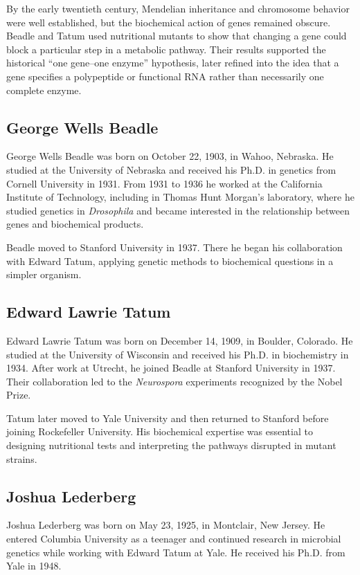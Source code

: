 By the early twentieth century, Mendelian inheritance and chromosome behavior were well established, but the biochemical action of genes remained obscure. Beadle and Tatum used nutritional mutants to show that changing a gene could block a particular step in a metabolic pathway. Their results supported the historical ``one gene--one enzyme'' hypothesis, later refined into the idea that a gene specifies a polypeptide or functional RNA rather than necessarily one complete enzyme.

\subsection{George Wells Beadle}

George Wells Beadle was born on October 22, 1903, in Wahoo, Nebraska. He studied at the University of Nebraska and received his Ph.D. in genetics from Cornell University in 1931. From 1931 to 1936 he worked at the California Institute of Technology, including in Thomas Hunt Morgan's laboratory, where he studied genetics in \textit{Drosophila} and became interested in the relationship between genes and biochemical products.

Beadle moved to Stanford University in 1937. There he began his collaboration with Edward Tatum, applying genetic methods to biochemical questions in a simpler organism.

\subsection{Edward Lawrie Tatum}

Edward Lawrie Tatum was born on December 14, 1909, in Boulder, Colorado. He studied at the University of Wisconsin and received his Ph.D. in biochemistry in 1934. After work at Utrecht, he joined Beadle at Stanford University in 1937. Their collaboration led to the \textit{Neurospora} experiments recognized by the Nobel Prize.

Tatum later moved to Yale University and then returned to Stanford before joining Rockefeller University. His biochemical expertise was essential to designing nutritional tests and interpreting the pathways disrupted in mutant strains.

\subsection{Joshua Lederberg}

Joshua Lederberg was born on May 23, 1925, in Montclair, New Jersey. He entered Columbia University as a teenager and continued research in microbial genetics while working with Edward Tatum at Yale. He received his Ph.D. from Yale in 1948.

